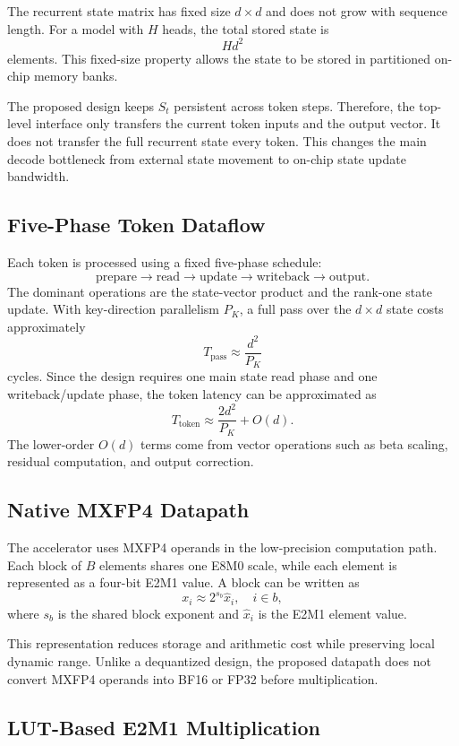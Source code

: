 \documentclass[conference]{IEEEtran}
\begin{document}
The recurrent state matrix has fixed size $d \times d$ and does not grow with
sequence length. For a model with $H$ heads, the total stored state is
\[
H d^2
\]
elements. This fixed-size property allows the state to be stored in partitioned
on-chip memory banks.

The proposed design keeps $S_t$ persistent across token steps. Therefore, the
top-level interface only transfers the current token inputs and the output
vector. It does not transfer the full recurrent state every token. This changes
the main decode bottleneck from external state movement to on-chip state update
bandwidth.

\subsection{Five-Phase Token Dataflow}

Each token is processed using a fixed five-phase schedule:
\[
\text{prepare} \rightarrow \text{read} \rightarrow \text{update}
\rightarrow \text{writeback} \rightarrow \text{output}.
\]
The dominant operations are the state-vector product and the rank-one state
update. With key-direction parallelism $P_K$, a full pass over the $d \times d$
state costs approximately
\[
T_{\text{pass}} \approx \frac{d^2}{P_K}
\]
cycles. Since the design requires one main state read phase and one
writeback/update phase, the token latency can be approximated as
\[
T_{\text{token}} \approx \frac{2d^2}{P_K} + O(d).
\]
The lower-order $O(d)$ terms come from vector operations such as beta scaling,
residual computation, and output correction.

\subsection{Native MXFP4 Datapath}

The accelerator uses MXFP4 operands in the low-precision computation path. Each
block of $B$ elements shares one E8M0 scale, while each element is represented
as a four-bit E2M1 value. A block can be written as
\[
x_i \approx 2^{s_b}\hat{x}_i, \quad i \in b,
\]
where $s_b$ is the shared block exponent and $\hat{x}_i$ is the E2M1 element
value.

This representation reduces storage and arithmetic cost while preserving local
dynamic range. Unlike a dequantized design, the proposed datapath does not
convert MXFP4 operands into BF16 or FP32 before multiplication.

\subsection{LUT-Based E2M1 Multiplication}
\end{document}
